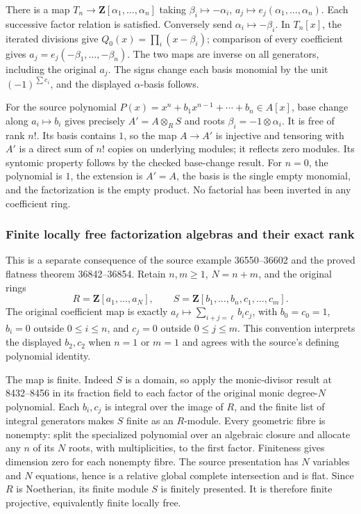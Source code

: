 There is a map \(T_n\to\mathbf Z[\alpha_1,\ldots,\alpha_n]\) taking \(\beta_i\mapsto-\alpha_i\), \(a_j\mapsto e_j(\alpha_1,\ldots,\alpha_n)\). Each successive factor relation is satisfied. Conversely send \(\alpha_i\mapsto-\beta_i\). In \(T_n[x]\), the iterated divisions give \(Q_0(x)=\prod_i(x-\beta_i)\); comparison of every coefficient gives \(a_j=e_j(-\beta_1,\ldots,-\beta_n)\). The two maps are inverse on all generators, including the original \(a_j\). The signs change each basis monomial by the unit \((-1)^{\sum e_i}\), and the displayed \(\alpha\)-basis follows.

For the source polynomial \(P(x)=x^n+b_1x^{n-1}+\cdots+b_n\in A[x]\), base change along \(a_i\mapsto b_i\) gives precisely \(A'=A\otimes_R S\) and roots \(\beta_i=-1\otimes\alpha_i\). It is free of rank \(n!\). Its basis contains \(1\), so the map \(A\to A'\) is injective and tensoring with \(A'\) is a direct sum of \(n!\) copies on underlying modules; it reflects zero modules. Its syntomic property follows by the checked base-change result. For \(n=0\), the polynomial is \(1\), the extension is \(A'=A\), the basis is the single empty monomial, and the factorization is the empty product. No factorial has been inverted in any coefficient ring.

\subsubsection{Finite locally free factorization algebras and their exact rank}\label{finite-locally-free-factorization-algebras-and-their-exact-rank}

This is a separate consequence of the source example 36550--36602 and the proved flatness theorem 36842--36854. Retain \(n,m\ge1\), \(N=n+m\), and the original rings \[
R=\mathbf Z[a_1,\ldots,a_N],\qquad
S=\mathbf Z[b_1,\ldots,b_n,c_1,\ldots,c_m].
\] The original coefficient map is exactly \(a_\ell\mapsto\sum_{i+j=\ell}b_i c_j\), with \(b_0=c_0=1\), \(b_i=0\) outside \(0\le i\le n\), and \(c_j=0\) outside \(0\le j\le m\). This convention interprets the displayed \(b_2,c_2\) when \(n=1\) or \(m=1\) and agrees with the source's defining polynomial identity.

The map is finite. Indeed \(S\) is a domain, so apply the monic-divisor result at 8432--8456 in its fraction field to each factor of the original monic degree-\(N\) polynomial. Each \(b_i,c_j\) is integral over the image of \(R\), and the finite list of integral generators makes \(S\) finite as an \(R\)-module. Every geometric fibre is nonempty: split the specialized polynomial over an algebraic closure and allocate any \(n\) of its \(N\) roots, with multiplicities, to the first factor. Finiteness gives dimension zero for each nonempty fibre. The source presentation has \(N\) variables and \(N\) equations, hence is a relative global complete intersection and is flat. Since \(R\) is Noetherian, its finite module \(S\) is finitely presented. It is therefore finite projective, equivalently finite locally free.


